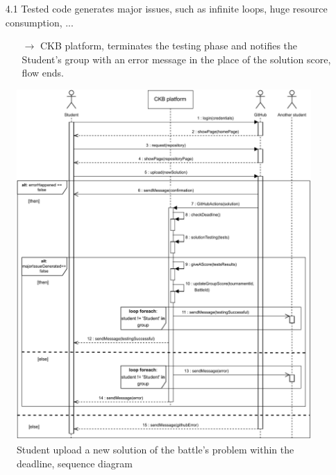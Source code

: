 \documentclass{article}
\begin{document}
{\begin{enumerate}
\begin{xltabular}{\textwidth}
\begin{itemize}
                  \item[4.1] Tested code generates major issues, such as infinite loops,
                        huge resource consumption, ...
                        \begin{itemize}
                            \item[$\rightarrow$] CKB platform, terminates the testing phase and
                                  notifies the Student's group with an error message in the place of the
                                  solution score, flow ends.
                        \end{itemize}
              \end{itemize}
          \end{xltabular}

          \begin{figure}[H]
              \centering
              \includegraphics[scale=0.95]{images/SequenceDiagrams/Sequence11.pdf}
              \caption{Student upload a new solution of the battle's problem within the deadline, sequence diagram}
              \label{fig:CorrectSolutionUploadSeqDiagram}
          \end{figure}


\end{enumerate}}
\end{document}
